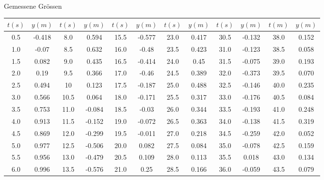 \begin{threeparttable}
    \caption{Gemessene Gr\"ossen}
    \begin{tabular}{*{12}{c}}
        \toprule
        $t(s)$  &  $y(m)$   &  $t(s)$   &  $y(m)$   &  $t(s)$  &  $y(m)$    &  $t(s)$   & $y(m)$    &  $t(s)$   &  $y(m)$   &  $t(m)$   &  $y(m)$ \\
        \midrule
        0.5     & -0.418    & 8.0       & 0.594     & 15.5     & -0.577     & 23.0      & 0.417     & 30.5      & -0.132    & 38.0      & 0.152   \\
        1.0     & -0.07     & 8.5       & 0.632     & 16.0     & -0.48      & 23.5      & 0.423     & 31.0      & -0.123    & 38.5      & 0.058   \\
        1.5     & 0.082     & 9.0       & 0.435     & 16.5     & -0.414     & 24.0      & 0.45      & 31.5      & -0.075    & 39.0      & 0.193   \\
        2.0     & 0.19      & 9.5       & 0.366     & 17.0     & -0.46      & 24.5      & 0.389     & 32.0      & -0.373    & 39.5      & 0.070   \\
        2.5     & 0.494     & 10        & 0.123     & 17.5     & -0.187     & 25.0      & 0.488     & 32.5      & -0.146    & 40.0      & 0.235   \\
        3.0     & 0.566     & 10.5      & 0.064     & 18.0     & -0.171     & 25.5      & 0.317     & 33.0      & -0.176    & 40.5      & 0.084   \\
        3.5     & 0.753     & 11.0      & -0.084    & 18.5     & -0.03      & 26.0      & 0.344     & 33.5      & -0.193    & 41.0      & 0.248   \\
        4.0     & 0.913     & 11.5      & -0.152    & 19.0     & -0.072     & 26.5      & 0.363     & 34.0      & -0.138    & 41.5      & 0.319   \\
        4.5     & 0.869     & 12.0      & -0.299    & 19.5     & -0.011     & 27.0      & 0.218     & 34.5      & -0.259    & 42.0      & 0.052   \\
        5.0     & 0.977     & 12.5      & -0.506    & 20.0     & 0.082      & 27.5      & 0.084     & 35.0      & -0.078    & 42.5      & 0.159   \\
        5.5     & 0.956     & 13.0      & -0.479    & 20.5     & 0.109      & 28.0      & 0.113     & 35.5      & 0.018     & 43.0      & 0.134   \\
        6.0     & 0.996     & 13.5      & -0.576    & 21.0     & 0.25       & 28.5      & 0.166     & 36.0      & -0.059    & 43.5      & 0.079   \\

\end{tabular}
\end{threeparttable}
